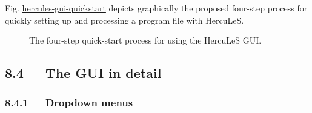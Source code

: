 \documentclass[a4paper]{article}
\begin{document}
Fig. \hyperref[hercules-gui-quickstart]{hercules-gui-quickstart} depicts graphically the proposed four-step process for quickly setting up and processing a program file with HercuLeS.
\begin{figure}
\label{hercules-gui-quickstart}
\noindent{}
\caption{The four-step quick-start process for using the HercuLeS GUI.}
\end{figure}


\subsection{8.4~~~The GUI in detail%
  \label{the-gui-in-detail}%
}


\subsubsection{8.4.1~~~Dropdown menus%
  \label{dropdown-menus}%
}
\end{document}
